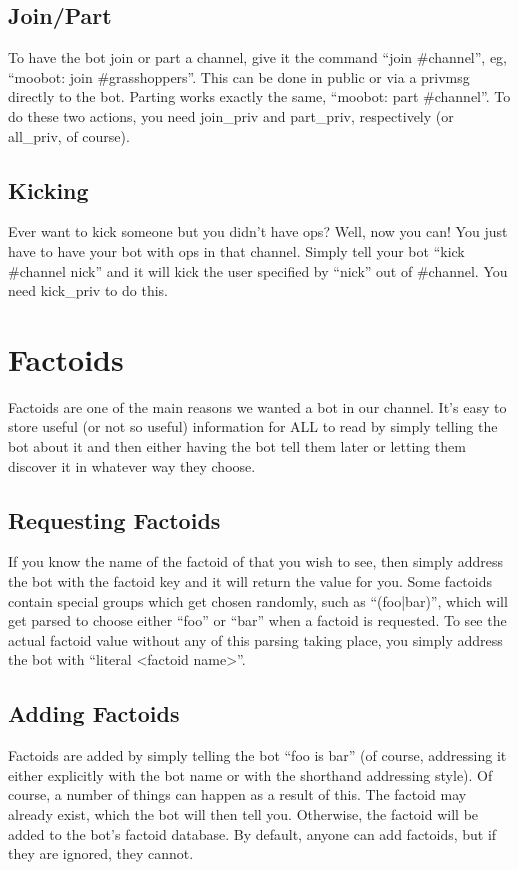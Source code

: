 \documentclass[titlepage]{article}
\begin{document}
		\subsection{Join/Part}
			To have the bot join or part a channel, give it the command ``join \#channel'', eg, ``moobot: join \#grasshoppers''.  This can be done in public or via a privmsg directly to the bot.  Parting works exactly the same, ``moobot: part \#channel''.  To do these two actions, you need join\_priv and part\_priv, respectively (or all\_priv, of course).
		\subsection{Kicking}
			Ever want to kick someone but you didn't have ops?  Well, now you
			can!  You just have to have your bot with ops in that channel.
			Simply tell your bot ``kick \#channel nick'' and it will kick the
			user specified by ``nick'' out of \#channel.  You need kick\_priv
			to do this.

	\section{Factoids}
		Factoids are one of the main reasons we wanted a bot in our channel.
		It's easy to store useful (or not so useful) information for ALL to
		read by simply telling the bot about it and then either having the bot
		tell them later or letting them discover it in whatever way they
		choose.
		
		\subsection{Requesting Factoids}
			If you know the name of the factoid of that you wish to see, then
			simply address the bot with the factoid key and it will return the
			value for you.  Some factoids contain special groups which get
			chosen randomly, such as ``(foo|bar)'', which will get parsed to
			choose either ``foo'' or ``bar'' when a factoid is requested.  To
			see the actual factoid value without any of this parsing taking
			place, you simply address the bot with ``literal <factoid name>''.
	
		\subsection{Adding Factoids}
			Factoids are added by simply telling the bot ``foo is bar'' (of
			course, addressing it either explicitly with the bot name or with
			the shorthand addressing style).  Of course, a number of things
			can happen as a result of this.  The factoid may already exist,
			which the bot will then tell you.  Otherwise, the factoid will be
			added to the bot's factoid database.  By default, anyone can add
			factoids, but if they are ignored, they cannot.
\end{document}
